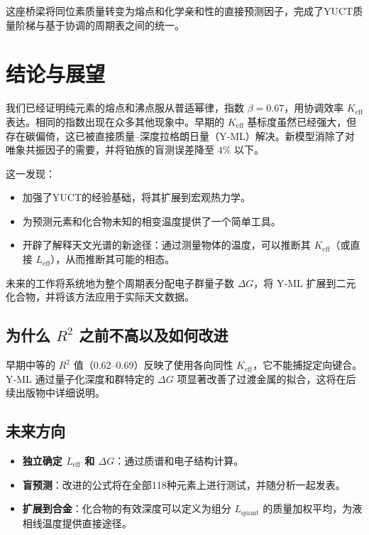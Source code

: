 \documentclass[11pt,a4paper]{article}
\newcommand{\Keff}{K_{\mathrm{eff}}}
\newcommand{\be}{\beta}
\begin{document}
	这座桥梁将同位素质量转变为熔点和化学亲和性的直接预测因子，完成了YUCT质量阶梯与基于协调的周期表之间的统一。
	
	\section{结论与展望}
	我们已经证明纯元素的熔点和沸点服从普适幂律，指数 \(\be = 0.67\)，用协调效率 \(\Keff\) 表达。相同的指数出现在众多其他现象中。早期的 \(K_{\mathrm{eff}}\) 基标度虽然已经强大，但存在碳偏倚，这已被直接质量–深度拉格朗日量（Y‑ML）解决。新模型消除了对唯象共振因子的需要，并将铂族的盲测误差降至 \(4\%\) 以下。
	
	这一发现：
	\begin{itemize}
		\item 加强了YUCT的经验基础，将其扩展到宏观热力学。
		\item 为预测元素和化合物未知的相变温度提供了一个简单工具。
		\item 开辟了解释天文光谱的新途径：通过测量物体的温度，可以推断其 \(\Keff\)（或直接 \(L_{\mathrm{eff}}\)），从而推断其可能的相态。
	\end{itemize}
	未来的工作将系统地为整个周期表分配电子群量子数 \(\Delta G\)，将 Y‑ML 扩展到二元化合物，并将该方法应用于实际天文数据。
	
	\subsection{为什么 \(R^2\) 之前不高以及如何改进}
	早期中等的 \(R^2\) 值（0.62–0.69）反映了使用各向同性 \(K_{\mathrm{eff}}\)，它不能捕捉定向键合。Y‑ML 通过量子化深度和群特定的 \(\Delta G\) 项显著改善了过渡金属的拟合，这将在后续出版物中详细说明。
	
	\subsection{未来方向}
	\begin{itemize}
		\item \textbf{独立确定 \(L_{\mathrm{eff}}\) 和 \(\Delta G\)}：通过质谱和电子结构计算。
		\item \textbf{盲预测}：改进的公式将在全部118种元素上进行测试，并随分析一起发表。
		\item \textbf{扩展到合金}：化合物的有效深度可以定义为组分 \(L_{\mathrm{quant}}\) 的质量加权平均，为液相线温度提供直接途径。
	\end{itemize}
	
\end{document}
